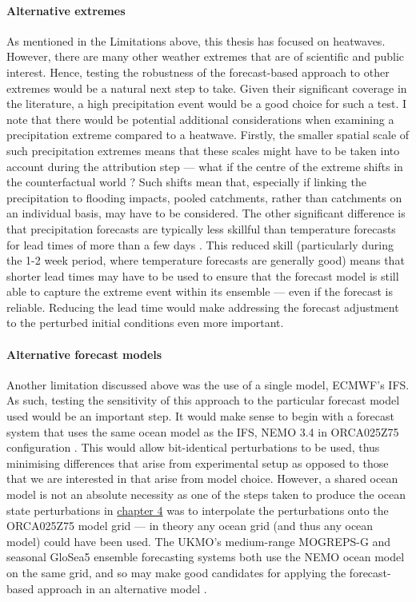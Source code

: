    \paragraph*{Alternative extremes}

      As mentioned in the Limitations above, this thesis has focused on heatwaves. However, there are many other weather extremes that are of scientific and public interest. Hence, testing the robustness of the forecast-based approach to other extremes would be a natural next step to take. Given their significant coverage in the literature, a high precipitation event would be a good choice for such a test. I note that there would be potential additional considerations when examining a precipitation extreme compared to a heatwave. Firstly, the smaller spatial scale of such precipitation extremes means that these scales might have to be taken into account during the attribution step --- what if the centre of the extreme shifts in the counterfactual world \citep{schaller_role_2020}? Such shifts mean that, especially if linking the precipitation to flooding impacts, pooled catchments, rather than catchments on an individual basis, may have to be considered. The other significant difference is that precipitation forecasts are typically less skillful than temperature forecasts for lead times of more than a few days \citep{rodwell_medium-range_2006,vitart_evolution_2014,swinbank_tigge_2016,monhart_skill_2018,mishra_multi-model_2019,haiden_evaluation_2021}. This reduced skill (particularly during the 1-2 week period, where temperature forecasts are generally good) means that shorter lead times may have to be used to ensure that the forecast model is still able to capture the extreme event within its ensemble --- even if the forecast is reliable. Reducing the lead time would make addressing the forecast adjustment to the perturbed initial conditions even more important.

    \paragraph*{Alternative forecast models}

      Another limitation discussed above was the use of a single model, ECMWF's IFS. As such, testing the sensitivity of this approach to the particular forecast model used would be an important step. It would make sense to begin with a forecast system that uses the same ocean model as the IFS, NEMO 3.4 in ORCA025Z75 configuration \citep{madec_nemo_2008}. This would allow bit-identical perturbations to be used, thus minimising differences that arise from experimental setup as opposed to those that we are interested in that arise from model choice. However, a shared ocean model is not an absolute necessity as one of the steps taken to produce the ocean state perturbations in \hyperref[ch4]{chapter 4} was to interpolate the perturbations onto the ORCA025Z75 model grid --- in theory any ocean grid (and thus any ocean model) could have been used. The UKMO's medium-range MOGREPS-G and seasonal GloSea5 ensemble forecasting systems both use the NEMO ocean model on the same grid, and so may make good candidates for applying the forecast-based approach in an alternative model \citep{maclachlan_global_2015}.

